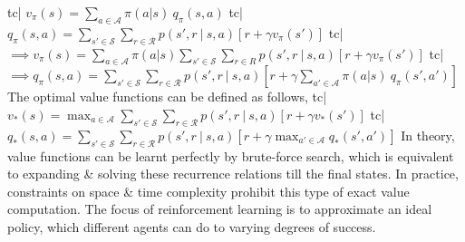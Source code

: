 tc| \( v_\pi(s) = \sum_{a \in \mathcal{A}} \pi(a|s) \ q_\pi(s, a) \)
tc| \( q_\pi(s, a) = \sum_{s' \in \mathcal{S}} \sum_{r \in \mathcal{R}} p(s', r \ | \ s, a) [r + \gamma v_\pi(s')] \)
tc| \( \implies v_\pi(s) = \sum_{a \in \mathcal{A}} \pi(a | s) \sum_{s' \in \mathcal{S}} \sum_{r \in R} p(s', r \ | \ s, a) [r + \gamma v_\pi(s')] \)
tc| \( \implies q_\pi(s, a) = \sum_{s' \in \mathcal{S}} \sum_{r \in \mathcal{R}} p(s', r \ | \ s, a) [r + \gamma\sum_{a' \in \mathcal{A}} \pi(a|s) \ q_\pi(s', a')] \)
The optimal value functions can be defined as follows,
tc| \( v_*(s) = \max_{a \in \mathcal{A}} \sum_{s' \in \mathcal{S}} \sum_{r \in \mathcal{R}} p(s', r \ | \ s, a) [r + \gamma v_*(s')] \)
tc| \( q_*(s, a) = \sum_{s' \in \mathcal{S}} \sum_{r \in \mathcal{R}} p(s', r \ | \ s, a) [r + \gamma \max_{a' \in \mathcal{A}} q_*(s', a')] \)
In theory, value functions can be learnt perfectly by brute-force search, which is equivalent to expanding & solving these recurrence relations till the final states. In practice, constraints on space & time complexity prohibit this type of exact value computation. The focus of reinforcement learning is to approximate an ideal policy, which different agents can do to varying degrees of success.